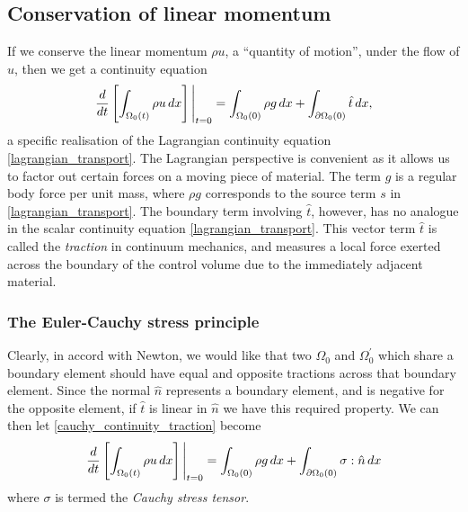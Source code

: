 \documentclass[11pt,a4paper]{memoir}
\newcommand{\omn}{{\Omega_0}}
\newcommand{\pomn}{{\partial\Omega_0}}
\begin{document}
\subsection{Conservation of linear momentum}

If we conserve the linear momentum $\rho u$, a ``quantity of motion'', under the flow of $u$, then we get a continuity equation
\begin{equation}\label{cauchy_continuity_traction}
    \eval{\frac{d}{dt}\left[\int_{\Omega_0(t)}\rho u\,dx\right]}_{t=0} = \int_{\omn(0)} \rho g\,dx + \int_{\pomn(0)}\hat{t}\,dx,
\end{equation}
a specific realisation of the Lagrangian continuity equation \eqref{lagrangian_transport}. The Lagrangian perspective is convenient
as it allows us to factor out certain forces on a moving piece of material. The term $g$ is a regular body force per unit mass, where $\rho g$ corresponds to
the source term $s$ in \eqref{lagrangian_transport}. The boundary term involving $\hat{t}$, however, has no analogue in the scalar continuity equation
\eqref{lagrangian_transport}.
This vector term $\hat{t}$ is called the \textit{traction} in continuum mechanics, and measures a local force exerted across the boundary
of the control volume due to the immediately adjacent material.

\subsubsection{The Euler-Cauchy stress principle}
Clearly, in accord with Newton, we would like that two $\Omega_0$ and $\Omega_0^\prime$
which share a boundary element should have equal and opposite tractions across that boundary element.
Since the normal $\hat{n}$ represents a boundary element, and is negative for the opposite element, if $\hat{t}$ is linear in $\hat{n}$ we have this required
property. We can then let \eqref{cauchy_continuity_traction} become
\begin{equation}\label{cauchy_continuity}
    \eval{\frac{d}{dt}\left[\int_{\Omega_0(t)}\rho u\,dx\right]}_{t=0} = \int_{\omn(0)} \rho g\,dx + \int_{\pomn(0)}\sigma:\hat{n}\,dx
\end{equation}
where $\sigma$ is termed the \textit{Cauchy stress tensor}.


\end{document}
